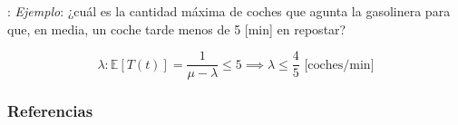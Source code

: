 \documentclass[xcolor={x11names}]{beamer}
\begin{document}
\begin{frame}{\secname: \subsecname}
    \textit{Ejemplo}: ¿cuál es la
    cantidad máxima de coches
    que agunta la gasolinera
    para que, en media, un coche tarde
    menos de 5 [min] en repostar?

    \begin{equation}
        \lambda: \mathbb{E}[T(t)] =
        \frac{1}{\mu-\lambda} \leq 5
        \implies \lambda \leq \frac{4}{5}
        \text{ [coches/min]}
    \end{equation}

    \begin{figure}
        
    \end{figure}

\end{frame}



\begin{frame}[allowframebreaks]
        \frametitle{Referencias}
        
        
\end{frame}
\end{document}
